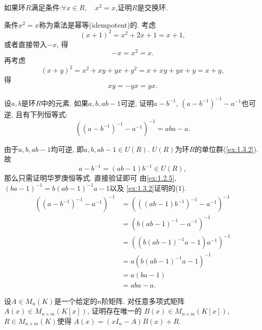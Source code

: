 \begin{problem}\label{ex:1.2.6}
    如果环$R$满足条件:$\forall x \in R,\quad x^2 = x$,证明$R$是交换环.
\end{problem}

\begin{solution}
    条件$x^2 = x$称为乘法是幂等(idempotent)的. 考虑
    \[
        (x + 1)^2 = x^2 + 2x + 1 = x + 1,
    \]
    或者直接带入$-x$,
    得
    \[
        -x = x^2 = x.
    \]
    再考虑
    \[
        (x + y)^2 = x^2 + xy + yx + y^2 = x + xy + yx + y = x + y,
    \]
    得
    \[
        xy = -yx = yx.
    \]
\end{solution}

\begin{problem}[华罗庚恒等式]
    设$a, b$是环$R$中的元素. 如果$a, b, ab - 1$可逆, 
证明$a - b^{-1}$, $(a - b^{-1})^{-1} - a^{-1}$也可逆, 且有下列恒等式:
\[
    \left((a - b^{-1})^{-1} - a^{-1}\right)^{-1} = aba - a.
\]
\end{problem}

\begin{solution}
    由于$a, b, ab - 1$均可逆, 即$a, b, ab - 1 \in U(R)$.
$U(R)$为环$R$的单位群(\ref{ex:1.3.2}).
故
    \[
        a - b^{-1} = (ab - 1)b^{-1} \in U(R),
    \]
    那么只需证明华罗庚恒等式. 直接验证即可
    由\ref{ex:1.2.5}, $(ba - 1)^{-1} = b(ab - 1)^{-1}a - 1$以及
    \ref{ex:1.3.2}证明的(1).
    \[
    \begin{aligned}
        \left((a - b^{-1})^{-1} - a^{-1}\right)^{-1} &= \left(((ab - 1)b^{-1})^{-1} - a^{-1}\right)^{-1}\\
        &= (b(ab - 1)^{-1} - a^{-1})^{-1}\\
        &= \left((b(ab - 1)^{-1}a - 1)a^{-1}\right)^{-1}\\
        &= a(b(ab - 1)^{-1}a - 1)^{-1}\\
        &= a(ba - 1)\\
        &= aba - a.
    \end{aligned}
    \]
\end{solution}

\begin{problem}[多项式矩阵的带余除法]
    设$A \in M_n(K)$是一个给定的$n$阶矩阵.
对任意多项式矩阵$A(x) \in M_{n \times m}(K[x])$, 证明存在唯一的
$B(x) \in M_{n \times m}(K[x])$, $R \in M_{n \times m}(K)$使得
$A(x) = (xI_n - A)B(x) + R$.
\end{problem}

